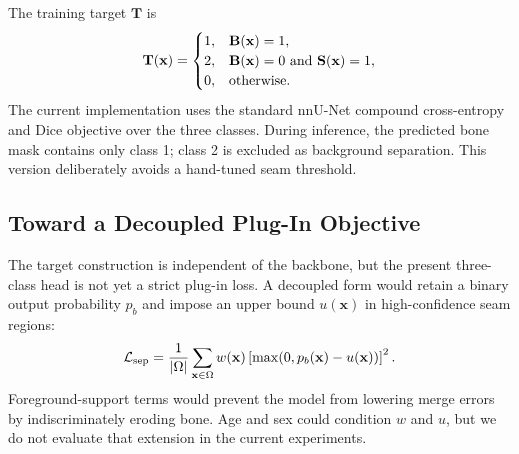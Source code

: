 The training target $\mathbf{T}$ is
\begin{equation}
\mathbf{T}(\mathbf{x})=
\begin{cases}
1,&\mathbf{B}(\mathbf{x})=1,\\
2,&\mathbf{B}(\mathbf{x})=0\ \text{and}\ \mathbf{S}(\mathbf{x})=1,\\
0,&\text{otherwise}.
\end{cases}
\end{equation}
The current implementation uses the standard nnU-Net compound cross-entropy and Dice objective over the three classes. During inference, the predicted bone mask contains only class 1; class 2 is excluded as background separation. This version deliberately avoids a hand-tuned seam threshold.

\subsection{Toward a Decoupled Plug-In Objective}

The target construction is independent of the backbone, but the present three-class head is not yet a strict plug-in loss. A decoupled form would retain a binary output probability $p_b$ and impose an upper bound $u(\mathbf{x})$ in high-confidence seam regions:
\begin{equation}
\mathcal{L}_{\mathrm{sep}}=\frac{1}{|\Omega|}\sum_{\mathbf{x}\in\Omega}w(\mathbf{x})\left[\max(0,p_b(\mathbf{x})-u(\mathbf{x}))\right]^2.
\end{equation}
Foreground-support terms would prevent the model from lowering merge errors by indiscriminately eroding bone. Age and sex could condition $w$ and $u$, but we do not evaluate that extension in the current experiments.
